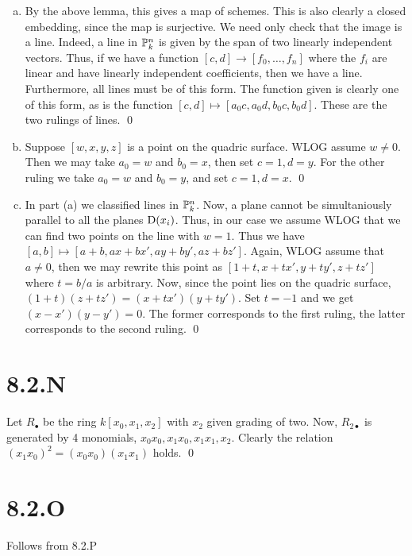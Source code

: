 \documentclass{article}
\begin{document}
\begin{enumerate}[a.]
    \item By the above lemma, this gives a map of schemes. This is also clearly a closed
          embedding, since the map is surjective. We need only check that the image is a
          line. Indeed, a line in $\P^n_k$ is given by the span of two
          linearly independent vectors. Thus, if we have a function
          $[c, d] \to [f_0, \dots, f_n]$ where the $f_i$ are linear and have
          linearly independent coefficients, then we have a line. Furthermore, all lines
          must be of this form. The function given is clearly one of this form, as is the
          function $[c, d] \mapsto [a_0c, a_0d, b_0c, b_0d]$. These are the two rulings of lines. \qed
    \item Suppose $[w, x, y, z]$ is a point on the quadric surface. WLOG assume
          $w \neq 0$. Then we may take $a_0=w$ and
          $b_0=x$, then set $c=1, d=y$. For the other ruling
          we take $a_0=w$ and $b_0=y$, and set
          $c=1, d=x$. \qed
    \item In part (a) we classified lines in $\P^n_k$. Now, a plane cannot
          be simultaniously parallel to all the planes $\D(x_i)$. Thus, in
          our case we assume WLOG that we can find two points on the line with
          $w=1$. Thus we have $[a, b] \mapsto [a+b, ax+bx', ay+by', az+bz']$. Again, WLOG assume
          that $a \neq 0$, then we may rewrite this point as
          $[1+t, x+tx', y+ty', z+tz']$ where $t=b/a$ is arbitrary. Now, since
          the point lies on the quadric surface, $(1+t)(z+tz')=(x+tx')(y+ty')$. Set
          $t=-1$ and we get $(x-x')(y-y')=0$. The former
          corresponds to the first ruling, the latter corresponds to the second ruling.
          \qed
\end{enumerate}

\section{8.2.N}
Let $R_{\bullet}$ be the ring $k[x_0, x_1, x_2]$ with
$x_2$ given grading of two. Now, $R_{2\bullet}$ is
generated by 4 monomials, $x_0x_0, x_1x_0, x_1x_1, x_2$. Clearly the relation
$(x_1x_0)^2=(x_0x_0)(x_1x_1)$ holds. \qed

\section{8.2.O}
Follows from 8.2.P
\end{document}
